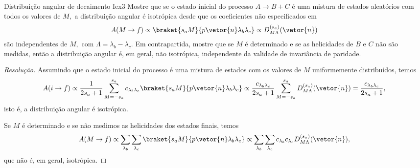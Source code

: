 \begin{exercício}{Distribuição angular de decaimento I}{ex3}
   Mostre que se o estado inicial do processo \(A \to B + C\) é uma mistura de estados aleatórios com todos os valores de \(M,\) a distribuição angular é isotrópica desde que os coeficientes não especificados em
   \begin{equation*}
      A(M \to f) \propto \braket{s_a M}{p \vetor{n} \lambda_b \lambda_c} \propto D^{(s_a)}_{M \Lambda}(\vetor{n})
   \end{equation*}
   são independentes de \(M,\) com \(\Lambda = \lambda_b - \lambda_c.\) Em contrapartida, mostre que se \(M\) é determinado e se as helicidades de \(B\) e \(C\) não são medidas, então a distribuição angular é, em geral, não isotrópica, independente da validade de invariância de paridade.
\end{exercício}
\begin{proof}[Resolução]
    Assumindo que o estado inicial do processo é uma mistura de estados com os valores de \(M\) uniformemente distribuídos, temos
    \begin{equation*}
       A(i \to f) \propto \frac{1}{2s_{a}+1}\sum_{M = -s_a}^{s_a} c_{\lambda_b \lambda_c}\braket{s_a M}{p \vetor{n} \lambda_b \lambda_c} \propto \frac{c_{\lambda_b \lambda_c}}{2s_a + 1} \sum_{M = -s_{a}}^{s_a} D^{(s_a)}_{M \Lambda}(\vetor{n}) = \frac{c_{\lambda_b \lambda_c}}{2s_a + 1},
    \end{equation*}
    isto é, a distribuição angular é isotrópica.

    Se \(M\) é determinado e se não medimos as helicidades dos estados finais, temos
    \begin{equation*}
       A(M \to f) \propto \sum_{\lambda_b} \sum_{\lambda_c} \braket{s_a M}{p \vetor{n} \lambda_b \lambda_c} \propto \sum_{\lambda_b}{\sum_{\lambda_c}{c_{\lambda_b} c_{\lambda_c} D^{(s_a)}_{M \Lambda}(\vetor{n})}},
    \end{equation*}
    que não é, em geral, isotrópica.
\end{proof}
